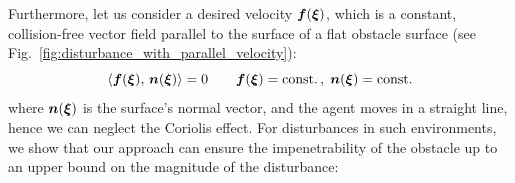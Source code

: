 
Furthermore, let us consider a desired velocity $\boldsymbol{f}(\boldsymbol{\xi})$, which is a constant, collision-free vector field parallel to the surface of a flat obstacle surface (see Fig.~\ref{fig:disturbance_with_parallel_velocity}):
\begin{equation}
	\dotprod{\vect f(\vecs \xi)}{\vecs n(\vecs \xi)} = 0
	 \qquad
\vect f(\vecs \xi) = \text{const.}
\, , \;
\vect n(\vecs \xi) = \text{const.}
\label{eq:parallel_velocity}
\end{equation}
where $\boldsymbol{n}(\boldsymbol{\xi})$ is the surface's normal vector, and the agent moves in a straight line, hence we can neglect the Coriolis effect. For disturbances in such environments, we show that our approach can ensure the impenetrability of the obstacle up to an upper bound on the magnitude of the disturbance:

